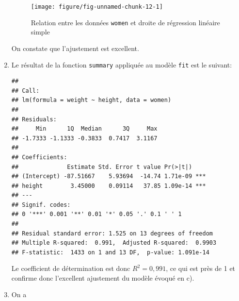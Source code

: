 \begin{solution}{2.3}
\begin{enumerate}
\begin{figure}
\begin{knitrout}
{\centering \texttt{[image: figure/fig-unnamed-chunk-12-1]}

}



\end{knitrout}
        \caption{Relation entre les données \texttt{women} et droite de régression linéaire simple}
        \label{fig:simple:women2}
      \end{figure}
      On constate que l'ajustement est excellent.
    \item Le résultat de la fonction \texttt{summary} appliquée au
      modèle \texttt{fit} est le suivant:
\begin{knitrout}
\color{fgcolor}\begin{kframe}
\begin{alltt}
\end{alltt}
\begin{verbatim}
##
## Call:
## lm(formula = weight ~ height, data = women)
##
## Residuals:
##     Min      1Q  Median      3Q     Max
## -1.7333 -1.1333 -0.3833  0.7417  3.1167
##
## Coefficients:
##              Estimate Std. Error t value Pr(>|t|)
## (Intercept) -87.51667    5.93694  -14.74 1.71e-09 ***
## height        3.45000    0.09114   37.85 1.09e-14 ***
## ---
## Signif. codes:
## 0 '***' 0.001 '**' 0.01 '*' 0.05 '.' 0.1 ' ' 1
##
## Residual standard error: 1.525 on 13 degrees of freedom
## Multiple R-squared:  0.991,	Adjusted R-squared:  0.9903
## F-statistic:  1433 on 1 and 13 DF,  p-value: 1.091e-14
\end{verbatim}
\end{kframe}
\end{knitrout}
      Le coefficient de détermination est donc
      $R^2 = 0,991$, %
      ce qui est près de 1 et confirme donc l'excellent
      ajustement du modèle évoqué en c).
    \item On a
\begin{knitrout}
\color{fgcolor}\begin{kframe}
\begin{alltt}
 \hlkwb{<-}  \hlopt{-} \hlopt{^}\hlstd{)}
 \hlkwb{<-} \hlstd{((} \hlopt{-} \hlopt{^}\hlstd{)}
 \hlkwb{<-}  \hlopt{-} \hlopt{^}\hlstd{)}

\end{alltt}
\end{kframe}
\end{knitrout}
\end{enumerate}
\end{solution}
